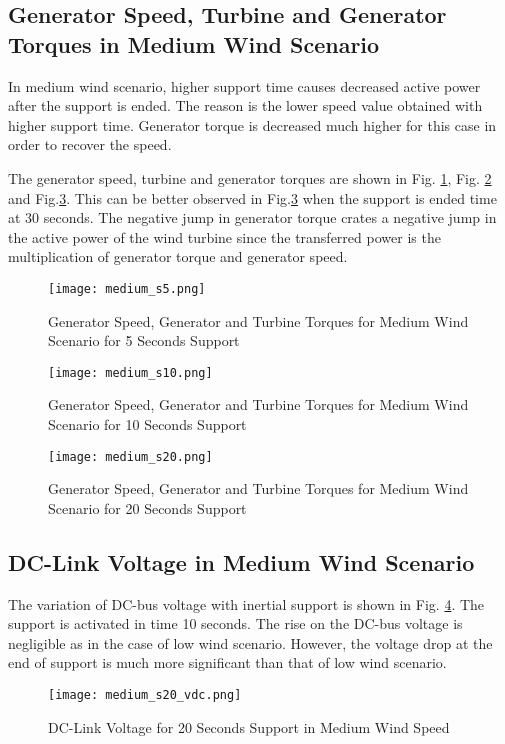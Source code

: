 \subsection{Generator Speed, Turbine and Generator Torques in Medium Wind Scenario}
In medium wind scenario, higher support time causes decreased active power after the support is ended. The reason is the lower speed value obtained with higher support time. Generator torque is decreased much higher for this case in order to recover the speed. \par
The generator speed, turbine and generator torques are shown in Fig. \ref{mid_torques1}, Fig. \ref{mid_torques2} and Fig.\ref{mid_torques3}. This can be better observed in Fig.\ref{mid_torques3} when the support is ended time at 30 seconds. The negative jump in generator torque crates a negative jump in the active power of the wind turbine since the transferred power is the multiplication of generator torque and generator speed.
\begin{figure}[h!]
	\centering
	\texttt{[image: medium\_s5.png]}
	\caption{Generator Speed, Generator and Turbine Torques for Medium Wind Scenario for 5 Seconds Support}
	\label{mid_torques1}
\end{figure}
\begin{figure}[h!]
	\centering
	\texttt{[image: medium\_s10.png]}
	\caption{Generator Speed, Generator and Turbine Torques for Medium Wind Scenario for 10 Seconds Support}
	\label{mid_torques2}
\end{figure}
\begin{figure}[h!]
	\centering
	\texttt{[image: medium\_s20.png]}
	\caption{Generator Speed, Generator and Turbine Torques for Medium Wind Scenario for 20 Seconds Support}
	\label{mid_torques3}
\end{figure}
\subsection{DC-Link Voltage in Medium Wind Scenario}
The variation of DC-bus voltage with inertial support is shown in Fig. \ref{med_vdc_s20}. The support is activated in time 10 seconds. The rise on the DC-bus voltage is negligible as in the case of low wind scenario. However, the voltage drop at the end of support is much more significant than that of low wind scenario. 
\begin{figure}[h!]
	\centering
	\texttt{[image: medium\_s20\_vdc.png]}
	\caption{DC-Link Voltage for 20 Seconds Support in Medium Wind Speed}
	\label{med_vdc_s20}
\end{figure}
